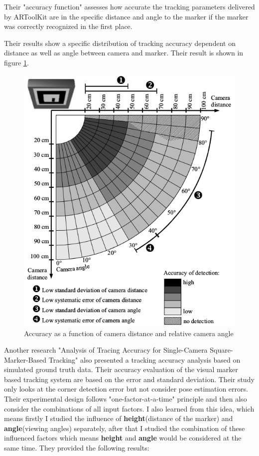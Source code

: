 Their "accuracy function" assesses how accurate the tracking
parameters delivered by ARToolKit are in the specific
distance and angle to the marker if the marker was
correctly recognized in the first place.

Their results show a specific distribution of tracking
accuracy dependent on distance as well as angle
between camera and marker. Their result is shown in figure \ref{fig:acc_func}.

\begin{figure}[h]
\centering
\includegraphics[scale=0.5]{./fig/acc_func.png}
\caption{Accuracy as a function of camera
distance and relative camera angle\cite{abawi2004accuracy}}
\label{fig:acc_func}
\end{figure}

Another research "Analysis of Tracing Accuracy for Single-Camera Square-Marker-Based Tracking"\cite{pentenrieder2006analysis} also presented a tracking accuracy analysis based on simulated ground truth data. Their accuracy evaluation of the visual marker based tracking system are based on the error and standard deviation. Their study only looks at the corner detection error but not consider pose estimation errors. Their experimental design follows "one-factor-at-a-time" principle and then also consider the combinations of all input factors. I also learned from this idea, which means firstly I studied the influence of \textbf{height}(distance of the marker) and \textbf{angle}(viewing angles) separately, after that I studied the combination of these influenced factors which means \textbf{height} and \textbf{angle} would be considered at the same time. They provided the following results:

